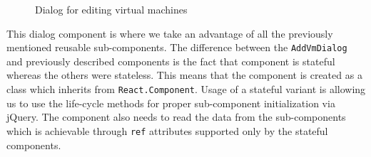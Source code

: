 \begin{figure}[h]
\caption{Dialog for editing virtual machines}
\label{editVMDialog}
\end{figure}

This dialog component is where we take an advantage of all the previously mentioned reusable sub-components. The difference between the \texttt{AddVmDialog} and previously described components is the fact that component is stateful whereas the others were stateless. This means that the component is created as a class which inherits from \texttt{React.Component}. Usage of a stateful variant is allowing us to use the life-cycle methods for proper sub-component initialization via jQuery. The component also needs to read the data from the sub-components which is achievable through \texttt{ref} attributes supported only by the stateful components.

